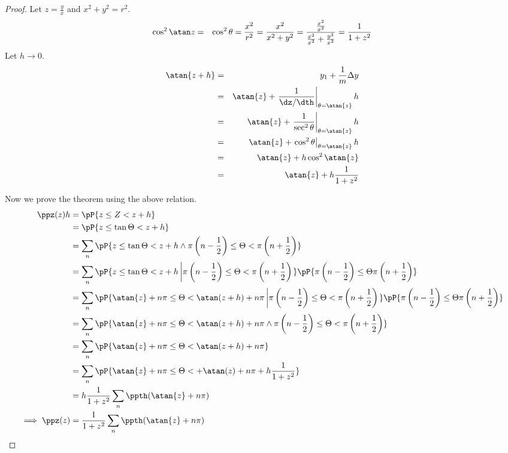 \begin{proof}
Let $z=\frac{y}{x}$ and $x^2 + y^2 = r^2$.
\begin{eqnarray*}
  \cos^2\atan z
    &=& \cos^2\theta
     =  \frac{x^2}{r^2}
     =  \frac{x^2}{x^2+y^2}
     =  \frac{\frac{x^2}{x^2}}{\frac{x^2}{x^2}+\frac{y^2}{x^2}}
     =  \frac{1}{1+z^2}
\end{eqnarray*}
Let $h\to0$.
\begin{eqnarray*}
  \atan{z+h}
    &=&    y_1 + \frac{1}{m} \Delta y
  \\&=&    \atan{z} + \left.\frac{1}{\dz/\dth}\right|_{\theta=\atan{z}} h
  \\&=&    \atan{z} + \left.\frac{1}{\sec^2\theta}\right|_{\theta=\atan{z}} h
  \\&=&    \atan{z} + \left.\cos^2\theta\right|_{\theta=\atan{z}} h
  \\&=&    \atan{z} + h\cos^2\atan{z}
  \\&=&    \atan{z} + h\frac{1}{1+z^2}
\end{eqnarray*}

Now we prove the theorem using the above relation.
\begin{align*}
  \ppz(z)h
    &=    \pP{z\le Z < z+h}
  \\&=    \pP{z\le \tan\Theta < z+h}
  \\&=    \sum_n \pP{z\le \tan\Theta < z+h \land
                 \pi\left(n-\frac{1}{2}\right) \le \Theta < \pi\left(n+\frac{1}{2}\right)
                 }
  \\&=    \sum_n \pP{z\le \tan\Theta < z+h \left|
                 \pi\left(n-\frac{1}{2}\right) \le \Theta < \pi\left(n+\frac{1}{2}\right)
                 \right.}
                 \pP{\pi\left(n-\frac{1}{2}\right) \le \Theta \pi\left(n+\frac{1}{2}\right)}
  \\&=    \sum_n \pP{\atan{z}+n\pi \le \Theta < \atan(z+h)+n\pi \left|
                 \pi\left(n-\frac{1}{2}\right) \le \Theta < \pi\left(n+\frac{1}{2}\right)
                 \right.}
                 \pP{\pi\left(n-\frac{1}{2}\right) \le \Theta \pi\left(n+\frac{1}{2}\right)}
  \\&=    \sum_n \pP{\atan{z}+n\pi \le \Theta < \atan(z+h)+n\pi \land
                 \pi\left(n-\frac{1}{2}\right) \le \Theta < \pi\left(n+\frac{1}{2}\right)
                 }
  \\&=    \sum_n \pP{\atan{z}+n\pi \le \Theta < \atan(z+h)+n\pi }
  \\&=    \sum_n \pP{\atan{z}+n\pi \le \Theta < +\atan(z)+n\pi + h\frac{1}{1+z^2} }
  \\&=    h\frac{1}{1+z^2} \sum_n \ppth(\atan{z}+n\pi)
\\\implies
  \ppz(z) &=  \frac{1}{1+z^2} \sum_n \ppth(\atan{z}+n\pi)
\end{align*}


\end{proof}
